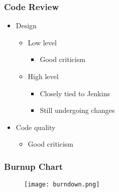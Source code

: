 \documentclass[t]{beamer}
\begin{document}
\begin{frame}
\frametitle{Code Review}

\vspace{1.3cm}

\begin{itemize}
	\item Design
	\begin{itemize}
		\item Low level
		\begin{itemize}
			\item Good criticism
		\end{itemize}
		\item High level
		\begin{itemize}
			\item Closely tied to Jenkins
			\item Still undergoing changes
		\end{itemize}
	\end{itemize}
	\item Code quality
	\begin{itemize}
		\item Good criticism
	\end{itemize}
\end{itemize}

\end{frame}


\begin{frame}
\frametitle{Burnup Chart}
\begin{figure}
\texttt{[image: burndown.png]}
\end{figure}

\end{frame}

\end{document}
